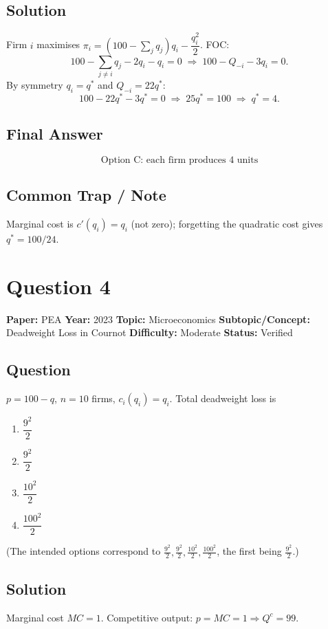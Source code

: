 \documentclass[11pt]{article}
\begin{document}
\subsection*{Solution}
Firm $i$ maximises $\pi_i=(100-\sum_j q_j)q_i-\dfrac{q_i^2}{2}$. FOC:
\[
100-\sum_{j\ne i}q_j-2q_i-q_i=0 \;\Longrightarrow\; 100-Q_{-i}-3q_i=0.
\]
By symmetry $q_i=q^*$ and $Q_{-i}=22 q^*$:
\[
100-22 q^*-3 q^*=0\;\Longrightarrow\; 25 q^*=100\;\Longrightarrow\; q^*=4.
\]

\subsection*{Final Answer}
\[
\boxed{\text{Option C: each firm produces 4 units}}
\]

\subsection*{Common Trap / Note}
Marginal cost is $c'(q_i)=q_i$ (not zero); forgetting the quadratic cost gives $q^*=100/24$.

\medskip

\section*{Question 4}
\textbf{Paper:} PEA \quad \textbf{Year:} 2023 \quad \textbf{Topic:} Microeconomics \quad \textbf{Subtopic/Concept:} Deadweight Loss in Cournot \quad \textbf{Difficulty:} Moderate \quad \textbf{Status:} Verified

\subsection*{Question}
$p=100-q$, $n=10$ firms, $c_i(q_i)=q_i$. Total deadweight loss is
\begin{enumerate}[label=(\Alph*)]
\item $\dfrac{9^2}{2}$ \qquad
\item $\dfrac{9^2}{2}$ \qquad
\item $\dfrac{10^2}{2}$ \qquad
\item $\dfrac{100^2}{2}$
\end{enumerate}
(The intended options correspond to $\frac{9^2}{2},\frac{9^2}{2},\frac{10^2}{2},\frac{100^2}{2}$, the first being $\frac{9^2}{2}$.)

\subsection*{Solution}
Marginal cost $MC=1$. Competitive output: $p=MC=1\Rightarrow Q^c=99$.
\end{document}
